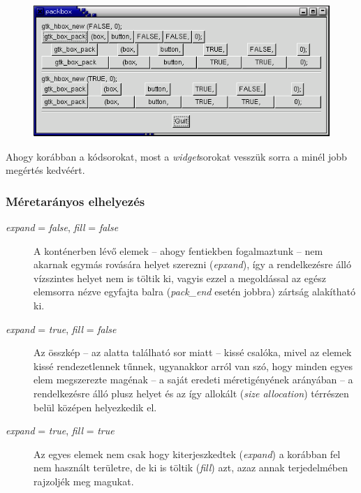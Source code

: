 \documentclass[a4paper,10pt]{article}
\begin{document}
\vspace{12 pt}
\begin{figure}[H]
\begin{center}
\includegraphics[height=50mm]{packbox1.png}
\end{center}
\end{figure}

Ahogy korábban a kódsorokat, most a \textit{widget}sorokat vesszük sorra a minél jobb megértés kedvéért.

\subsubsection{Méretarányos elhelyezés}

\begin{description}
 \item[\textit{expand} = \textit{false}, \textit{fill} = \textit{false}] A konténerben lévő elemek -- ahogy fentiekben fogalmaztunk -- nem akarnak egymás rovására helyet szerezni (\textit{epxand}), így a rendelkezésre álló vízszintes helyet nem is töltik ki, vagyis ezzel a megoldással az egész elemsorra nézve egyfajta balra (\textit{pack\_end} esetén jobbra) zártság alakítható ki.

 \item[\textit{expand} = \textit{true}, \textit{fill} = \textit{false}] Az összkép -- az alatta található sor miatt -- kissé csalóka, mivel az elemek kissé rendezetlennek tűnnek, ugyanakkor arról van szó, hogy minden egyes elem megszerezte magénak -- a saját eredeti méretigényének arányában -- a rendelkezésre álló plusz helyet és az így allokált (\textit{size allocation}) térrészen belül középen helyezkedik el.

 \item[\textit{expand} = \textit{true}, \textit{fill} = \textit{true}] Az egyes elemek nem csak hogy kiterjeszkedtek (\textit{expand}) a korábban fel nem használt területre, de ki is töltik (\textit{fill}) azt, azaz annak terjedelmében rajzoljék meg magukat.
\end{description}
\end{document}
